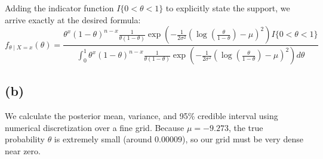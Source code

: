 \documentclass[
  letterpaper,
  DIV=11,
  numbers=noendperiod]{scrartcl}
\begin{document}
Adding the indicator function \(I\{0 < \theta < 1\}\) to explicitly
state the support, we arrive exactly at the desired formula: \[
f_{\theta \mid X = x}(\theta) = \frac{ \theta^x (1 - \theta)^{n-x} \frac{1}{\theta(1 - \theta)} \exp \left(-\frac{1}{2 \sigma^2} \left(\log (\frac{\theta}{1 - \theta}) - \mu \right)^2 \right) I\{0 < \theta < 1\} }{\int_0^1 \theta^x (1 - \theta)^{n-x} \frac{1}{\theta(1 - \theta)} \exp \left(-\frac{1}{2 \sigma^2} \left(\log (\frac{\theta}{1 - \theta}) - \mu \right)^2 \right) d\theta }
\]

\subsection{(b)}\label{b-2}

We calculate the posterior mean, variance, and 95\% credible interval
using numerical discretization over a fine grid. Because
\(\mu = -9.273\), the true probability \(\theta\) is extremely small
(around \(0.00009\)), so our grid must be very dense near zero.
\end{document}
